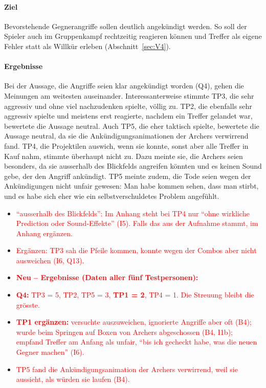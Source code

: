 \documentclass[../Main.tex]{subfiles}
\begin{document}
\paragraph{Ziel}
Bevorstehende Gegnerangriffe sollen deutlich angekündigt werden. So soll der Spieler auch im Gruppenkampf rechtzeitig reagieren können und Treffer als eigene Fehler statt als Willkür erleben (Abschnitt~\ref{sec:V4}).

\paragraph{Ergebnisse}
Bei der Aussage, die Angriffe seien klar angekündigt worden (Q4), gehen die Meinungen am weitesten auseinander. Interessanterweise stimmte TP3, die sehr aggressiv und ohne viel nachzudenken spielte, völlig zu. TP2, die ebenfalls sehr aggressiv spielte und meistens erst reagierte, nachdem ein Treffer gelandet war, bewertete die Aussage neutral. Auch TP5, die eher taktisch spielte, bewertete die Aussage neutral, da sie die Ankündigungsanimationen der Archers verwirrend fand. TP4, die Projektilen auswich, wenn sie konnte, sonst aber alle Treffer in Kauf nahm, stimmte überhaupt nicht zu. Dazu meinte sie, die Archers seien besonders, da sie ausserhalb des Blickfelds angreifen könnten und es keinen Sound gebe, der den Angriff ankündigt. TP5 meinte zudem, die Tode seien wegen der Ankündigungen nicht unfair gewesen: Man habe kommen sehen, dass man stirbt, und es habe sich eher wie ein selbstverschuldetes Problem angefühlt.

\begin{itemize}[leftmargin=1.5cm]
    \item \textcolor{red}{\enquote{ausserhalb des Blickfelds}: Im Anhang steht bei TP4 nur \enquote{ohne wirkliche Prediction oder Sound-Effekte} (I5). Falls das aus der Aufnahme stammt, im Anhang ergänzen.}
    \item \textcolor{red}{Ergänzen: TP3 sah die Pfeile kommen, konnte wegen der Combos aber nicht ausweichen (I6, Q13).}
\end{itemize}

\begin{itemize}[leftmargin=1.5cm]
    \item \textcolor{red}{\textbf{Neu -- Ergebnisse (Daten aller fünf Testpersonen):}}
    \item \textcolor{red}{\textbf{Q4:} TP3 = 5, TP2, TP5 = 3, \textbf{TP1 = 2}, TP4 = 1. Die Streuung bleibt die grösste.}
    \item \textcolor{red}{\textbf{TP1 ergänzen:} versuchte auszuweichen, ignorierte Angriffe aber oft (B4); wurde beim Springen auf Boxen von Archers abgeschossen (B4, I1b); empfand Treffer am Anfang als unfair, \enquote{bis ich gecheckt habe, was die neuen Gegner machen} (I6).}
    \item \textcolor{red}{TP5 fand die Ankündigungsanimation der Archers verwirrend, weil sie aussieht, als würden sie laufen (B4).}
\end{itemize}
\end{document}
